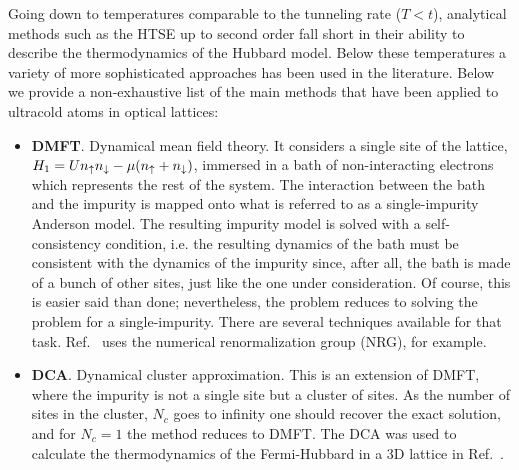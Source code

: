 Going down to temperatures comparable to the tunneling rate ($T<t$), analytical
methods such as the HTSE up to second order fall short in their ability to
describe the thermodynamics of the Hubbard model.  Below these temperatures a
variety of more sophisticated approaches has been used in the literature.
Below we provide a non-exhaustive list of the main methods that have been
applied to ultracold atoms in optical lattices:  

\begin{itemize} 

\item \textbf{DMFT}.  Dynamical mean field theory. It considers a single site
of the lattice, $H_{1}= Un_{ \uparrow }n_{ \downarrow} - \mu (n_{ \uparrow } + n_{ \downarrow})$,
immersed in a bath of non-interacting electrons which represents the rest of
the system.   The interaction between the bath and the impurity is mapped onto
what is referred to as a single-impurity Anderson model.    The resulting
impurity model is solved with a self-consistency condition, i.e.  the resulting
dynamics of the bath must be consistent with the dynamics of the impurity
since, after all, the bath is made of a bunch of other sites, just like the one
under consideration.  Of course, this is easier said than done; nevertheless,
the problem reduces to solving the problem for a single-impurity.  There are
several techniques available for that task.  Ref.~\cite{Helmes2008} uses the
numerical renormalization group (NRG), for example. 


\item \textbf{DCA}.  Dynamical cluster approximation.  This is an extension of
DMFT, where the impurity is not a single site but a cluster of sites.  As the
number of sites in the cluster, $N_{c}$ goes to infinity one should recover the
exact solution, and for $N_{c}=1$ the method reduces to DMFT.   The DCA was used
to calculate the thermodynamics of the Fermi-Hubbard in a 3D lattice in
Ref.~\cite{Fuchs2011}.


\end{itemize}
